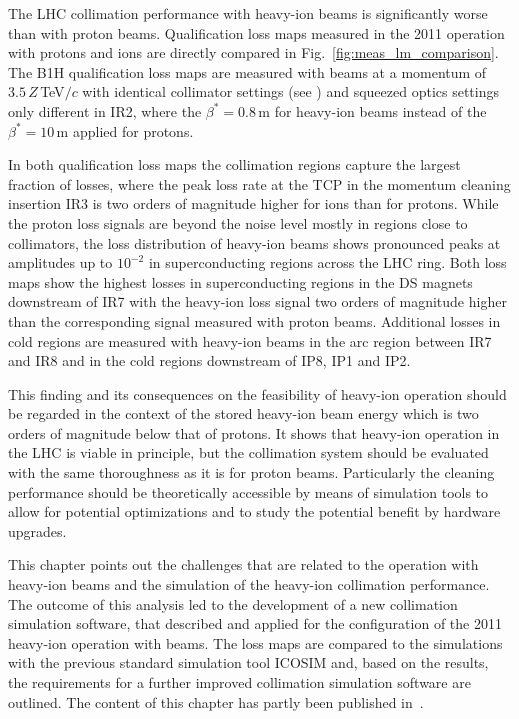 The LHC collimation performance with heavy-ion beams is significantly worse than with proton beams. Qualification loss maps measured in the 2011 operation with protons and \lead ions are directly compared in Fig.~\ref{fig:meas_lm_comparison}. The B1H qualification loss maps are measured with beams at a momentum of $3.5\,Z\,$TeV$/c$ with identical collimator settings (see ) and squeezed optics settings  only different in IR2, where the \mbox{$\beta^*=0.8\,$m} for heavy-ion beams instead of the $\beta^*=10\,$m applied for protons. 

In both qualification loss maps the collimation regions capture the largest fraction of losses, where the peak loss rate at the TCP in the momentum cleaning insertion IR3 is two orders of magnitude higher for \lead ions than for protons. While the proton loss signals are beyond the noise level mostly in regions close to collimators, the loss distribution of heavy-ion beams shows pronounced peaks at amplitudes up to $10^{-2}$ in superconducting regions across the LHC ring. Both loss maps show the highest losses in superconducting regions in the DS magnets downstream of IR7 with the heavy-ion loss signal two orders of magnitude higher than the corresponding signal measured with proton beams. Additional losses in cold regions are measured with heavy-ion beams in the arc region between IR7 and IR8 and in the cold regions downstream of IP8, IP1 and IP2. 

This finding and its consequences on the feasibility of heavy-ion operation should be regarded in the context of the stored heavy-ion beam energy which is two orders of magnitude below that of protons. It shows that heavy-ion operation in the LHC is viable in principle, but the collimation system should be evaluated with the same thoroughness as it is for proton beams. Particularly the cleaning performance should be theoretically accessible by means of simulation tools to allow for potential optimizations and to study the potential benefit by hardware upgrades. 

\newpage 
This chapter points out the challenges that are related to the operation with heavy-ion beams and the simulation of the heavy-ion collimation performance. The outcome of this analysis led to the development of a new collimation simulation software, that described and applied for the configuration of the 2011 heavy-ion operation with \lead beams. The loss maps are compared to the simulations with the previous standard simulation tool ICOSIM and, based on the results, the requirements for a further improved collimation simulation software are outlined. The content of this chapter has partly been published in~\cite{phermes_hb2014,NIM:819}.
%



